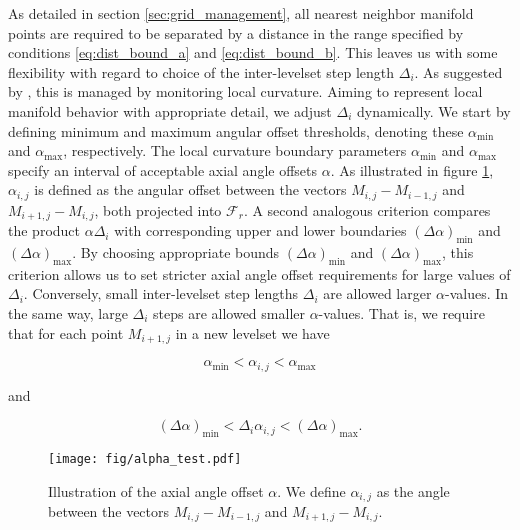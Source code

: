 As detailed in section \ref{sec:grid_management}, all nearest neighbor manifold points are required to be separated by a distance in the range specified by conditions \eqref{eq:dist_bound_a} and \eqref{eq:dist_bound_b}. This leaves us with some flexibility with regard to choice of the inter-levelset step length $\Delta_i$. As suggested by \cite{Survey}, this is managed by monitoring local curvature. Aiming to represent local manifold behavior with appropriate detail, we adjust $\Delta_i$ dynamically. We start by defining minimum and maximum angular offset thresholds, denoting these $\alpha_{\text{min}}$ and $\alpha_{\text{max}}$, respectively. The local curvature boundary parameters $\alpha_{\text{min}}$ and $\alpha_{\text{max}}$ specify an interval of acceptable axial angle offsets $\alpha$. As illustrated in figure \ref{fig:alpha_test}, $\alpha_{i,j}$ is defined as the angular offset between the vectors $M_{i,j}-M_{i-1,j}$ and $M_{i+1,j}-M_{i,j}$, both projected into $\mathcal{F}_r$. A second analogous criterion compares the product $\alpha\Delta_i$ with corresponding upper and lower boundaries $(\Delta \alpha)_{\text{min}}$ and $(\Delta \alpha)_{\text{max}}$. By choosing appropriate bounds $(\Delta \alpha)_{\text{min}}$ and $(\Delta \alpha)_{\text{max}}$, this criterion allows us to set stricter axial angle offset requirements for large values of $\Delta_i$. Conversely, small inter-levelset step lengths $\Delta_i$ are allowed larger $\alpha$-values. In the same way, large $\Delta_i$ steps are allowed smaller $\alpha$-values. That is, we require that for each point $M_{i+1,j}$ in a new levelset we have

\begin{equation}\label{eq:curvature_test_1}
\alpha_{\text{min}} < \alpha_{i,j} < \alpha_{\text{max}}
\end{equation}

and 

\begin{equation}\label{eq:curvature_test_2}
(\Delta \alpha)_{\text{min}} < \Delta_i\alpha_{i,j} < (\Delta \alpha)_{\text{max}}.
\end{equation}

\begin{figure}[h!] 
\centering
\texttt{[image: fig/alpha\_test.pdf]}
\caption{Illustration of the axial angle offset $\alpha$. We define $\alpha_{i,j}$ as the angle between the vectors $M_{i,j}-M_{i-1,j}$ and $M_{i+1,j}-M_{i,j}$.}\label{fig:alpha_test}
\end{figure}

